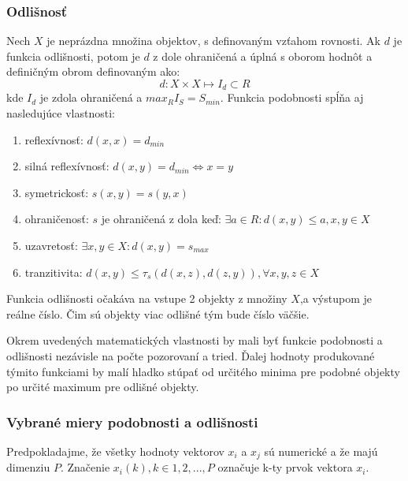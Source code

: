 \documentclass[slovak,master,dept460,male,cpp,cpdeclaration]{diploma}
\begin{document}
\subsubsection{Odlišnosť}
Nech $X$ je neprázdna množina objektov, s definovaným vzťahom rovnosti. Ak $d$ je funkcia odlišnosti, potom je $d$ z dole ohraničená a úplná s oborom hodnôt a definičným obrom definovaným ako:
\begin{equation}
d: X \times X \mapsto I_d \subset R
\end{equation}
kde $I_d$ je zdola ohraničená a $max_R I_S = S_{min}$.
Funkcia podobnosti spĺňa aj nasledujúce vlastnosti:
\begin{enumerate}
\item reflexívnosť: $d(x,x) = d_{min}$
\item silná reflexívnosť: $d(x,y) = d_{min} \iff x = y $
\item symetrickosť: $s(x,y) = s(y,x)$
\item ohraničenosť: $s$ je ohraničená z dola keď: $ \exists a \in R: d(x,y) \leq a, x,y \in X$
\item uzavretosť: $\exists  x,y \in X: d(x,y) = s_{max}$
\item tranzitivita: $d(x,y) \leq \tau_s(d(x,z), d(z,y)), \forall x,y,z \in X$
\end{enumerate}
Funkcia odlišnosti očakáva na vstupe 2 objekty z množiny $X$,a výstupom je reálne číslo. Čim sú  objekty viac odlišné  tým bude číslo väčšie.

Okrem uvedených matematických vlastnosti by mali byť funkcie podobnosti a odlišnosti nezávisle na počte pozorovaní a tried. Ďalej hodnoty produkované týmito funkciami by malí hladko stúpať od určitého minima pre podobné objekty po určité maximum pre odlišné objekty.

\subsubsection{Vybrané miery podobnosti a odlišnosti}
Predpokladajme, že všetky hodnoty  vektorov $x_i$ a $x_j$ sú numerické a že majú dimenziu $P$. Značenie $x_i(k), k \in {1,2,...,P}$ označuje k-ty prvok vektora $x_i$.
\end{document}
